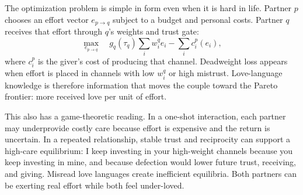 \documentclass[11pt]{article}
\begin{document}
The optimization problem is simple in form even when it is hard in life. Partner $p$ chooses an effort vector $e_{p\rightarrow q}$ subject to a budget and personal costs. Partner $q$ receives that effort through $q$'s weights and trust gate:
\begin{equation}
\max_{e_{p\rightarrow q}} \quad g_q(\tau_q)\sum_i w_i^q e_i - \sum_i c_i^p(e_i),
\end{equation}
where $c_i^p$ is the giver's cost of producing that channel. Deadweight loss appears when effort is placed in channels with low $w_i^q$ or high mistrust. Love-language knowledge is therefore information that moves the couple toward the Pareto frontier: more received love per unit of effort.

This also has a game-theoretic reading. In a one-shot interaction, each partner may underprovide costly care because effort is expensive and the return is uncertain. In a repeated relationship, stable trust and reciprocity can support a high-care equilibrium: I keep investing in your high-weight channels because you keep investing in mine, and because defection would lower future trust, receiving, and giving. Misread love languages create inefficient equilibria. Both partners can be exerting real effort while both feel under-loved.
\end{document}
